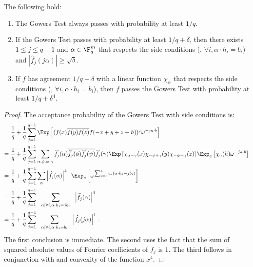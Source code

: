 \begin{lemma}\label{lemma:Gowers} The following hold:
\begin{enumerate}
\item The Gowers Test always passes with probability at least ${1}/{q}$.
\item If the Gowers Test passes with probability at least ${1}/{q}+\delta$, then there
exists $1 \leq j \leq q-1$ and $\alpha \in \F_q^m$ that respects the side conditions (\ie,
$\forall i, \alpha \cdot h_i = b_i$) and $| \widehat{f}_j(j \alpha) | \geq \sqrt{\delta}$.
\item If $f$ has agreement ${1}/{q}+\delta$ with a linear function $\chi_\alpha$ that respects
the side conditions (\ie,
$\forall i, \alpha \cdot h_i = b_i$), then $f$ passes the Gowers Test with probability at least
${1}/{q}+ {\delta^4}$.
\end{enumerate}
\end{lemma}
\begin{proof} The acceptance probability of the Gowers Test with side conditions is:
\begin{align*}
   &  \frac{1}{q} + \frac{1}{q} \sum_{j=1}^{q-1} \Exp \left[ (f(x) \overline{f(y)}\overline{f(z)} f(-x+y+z+h))^j   \omega^{-j a\cdot b} \right] \\
  =\ & \frac{1}{q} + \frac{1}{q}  \sum_{j=1}^{q-1} \sum_{\alpha, \phi, \psi, \gamma}
 \widehat{f_j}(\alpha) \overline{\widehat{f_j}(\phi)} \overline{\widehat{f_j}(\psi)}\widehat{f_j}(\gamma)
  \Exp \left[ \chi_{\alpha - \gamma}(x) \chi_{-\phi + \gamma}(y) \chi_{-\psi + \gamma}(z)    \right]
  \Exp_a \left[ \chi_{\gamma}(h) \omega^{-j a\cdot b}    \right]  \\
  =\ &  \frac{1}{q} + \frac{1}{q}  \sum_{j=1}^{q-1} \sum_\alpha \left| \widehat{f}_j (\alpha)\right|^4
  \cdot \Exp_a \left[ \omega^{\sum_{i=1}^k a_i (\alpha \cdot h_i - j b_i)}  \right] \\
  =\ &  \frac{1}{q} + \frac{1}{q}  \sum_{j=1}^{q-1} \ \  \sum_{\alpha| \forall i, \alpha\cdot h_i = j b_i}
  \ \ \left| \widehat{f}_j (\alpha)\right|^4 \\
   =\ &  \frac{1}{q} + \frac{1}{q}  \sum_{j=1}^{q-1} \ \  \sum_{\alpha| \forall i, \alpha\cdot h_i =  b_i}
  \ \ \left| \widehat{f}_j (j\alpha)\right|^4\,. \\
\end{align*}
The first conclusion is immediate. The second uses the fact that the sum of squared
absolute values of Fourier coefficients of $f_j$ is $1$.
 The third follows in conjunction with  and convexity of the
 function $x^4$.
\end{proof}

